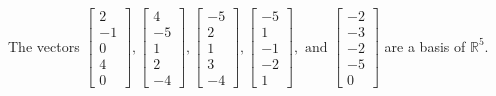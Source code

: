 \begin{exercise}
\begin{exerciseStatement}
  \end{exerciseStatement}
  \begin{exerciseAnswer}
   The vectors \(\left[\begin{array}{r}
2 \\
-1 \\
0 \\
4 \\
0
\end{array}\right] , \left[\begin{array}{r}
4 \\
-5 \\
1 \\
2 \\
-4
\end{array}\right] , \left[\begin{array}{r}
-5 \\
2 \\
1 \\
3 \\
-4
\end{array}\right] , \left[\begin{array}{r}
-5 \\
1 \\
-1 \\
-2 \\
1
\end{array}\right] , \text{ and } \left[\begin{array}{r}
-2 \\
-3 \\
-2 \\
-5 \\
0
\end{array}\right]\) 
  	 are  a basis of \(\mathbb{R}^5\).
  


  \end{exerciseAnswer}
\end{exercise}